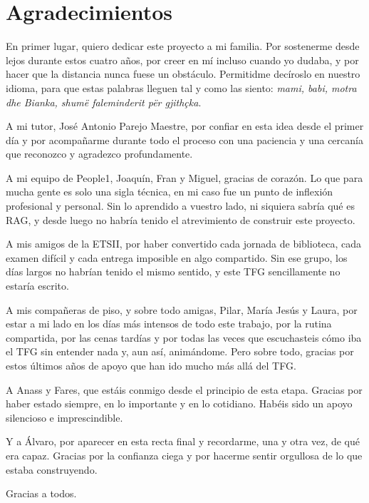 
\chapter*{Agradecimientos}\label{cap:agradecimientos}

En primer lugar, quiero dedicar este proyecto a mi familia. Por sostenerme desde lejos durante estos cuatro años, por creer en mí incluso cuando yo dudaba, y por hacer que la distancia nunca fuese un obstáculo. Permitidme decíroslo en nuestro idioma, para que estas palabras lleguen tal y como las siento: \textit{mami, babi, motra dhe Bianka, shumë faleminderit për gjithçka}.

A mi tutor, José Antonio Parejo Maestre, por confiar en esta idea desde el primer día y por acompañarme durante todo el proceso con una paciencia y una cercanía que reconozco y agradezco profundamente.

A mi equipo de People1, Joaquín, Fran y Miguel, gracias de corazón. Lo que para mucha gente es solo una sigla técnica, en mi caso fue un punto de inflexión profesional y personal. Sin lo aprendido a vuestro lado, ni siquiera sabría qué es RAG, y desde luego no habría tenido el atrevimiento de construir este proyecto.

A mis amigos de la ETSII, por haber convertido cada jornada de biblioteca, cada examen difícil y cada entrega imposible en algo compartido. Sin ese grupo, los días largos no habrían tenido el mismo sentido, y este TFG sencillamente no estaría escrito.

A mis compañeras de piso, y sobre todo amigas, Pilar, María Jesús y Laura, por estar a mi lado en los días más intensos de todo este trabajo, por la rutina compartida, por las cenas tardías y por todas las veces que escuchasteis cómo iba el TFG sin entender nada y, aun así, animándome. Pero sobre todo, gracias por estos últimos años de apoyo que han ido mucho más allá del TFG.

A Anass y Fares, que estáis conmigo desde el principio de esta etapa. Gracias por haber estado siempre, en lo importante y en lo cotidiano. Habéis sido un apoyo silencioso e imprescindible.

Y a Álvaro, por aparecer en esta recta final y recordarme, una y otra vez, de qué era capaz. Gracias por la confianza ciega y por hacerme sentir orgullosa de lo que estaba construyendo.

Gracias a todos.

\clearpage
